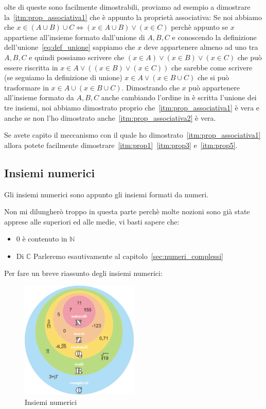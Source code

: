 \documentclass{article}
\begin{document}
olte di queste sono facilmente dimostrabili, proviamo ad esempio a dimostrare la~\ref{itm:prop_associativa1} che è appunto la proprietà associativa: \newline
Se noi abbiamo che $x \in (A \cup B) \cup C \Leftrightarrow (x \in A \cup B) \lor (x \in C)$ perchè appunto se $x$ appartiene all'insieme formato dall'unione di $A,B,C$ e conoscendo la definizione dell'unione~\ref{eq:def_unione}  sappiamo che $x$ deve appartenere almeno ad uno tra $A,B,C$ e quindi possiamo scrivere che $(x \in A) \lor (x \in B) \lor (x \in C)$ che può essere riscritta in $x \in A \lor ((x \in B) \lor (x \in C))$ che sarebbe come scrivere (se seguiamo la definizione di unione) $x \in A \lor (x \in B \cup C)$ che si può trasformare in $x \in A \cup (x \in B \cup C)$.
Dimostrando che $x$ può appartenere all'insieme formato da $A,B,C$ anche cambiando l'ordine in è scritta l'unione dei tre insiemi, noi abbiamo dimostrato proprio che~\ref{itm:prop_associativa1} è vera e anche se non l'ho dimostrato anche~\ref{itm:prop_associativa2} è vera.\par
Se avete capito il meccanismo con il quale ho dimostrato~\ref{itm:prop_associativa1} allora potete facilmente dimostrare~\ref{itm:prop1}~\ref{itm:prop3} e~\ref{itm:prop5}.


\subsection{Insiemi numerici}
Gli insiemi numerici sono appunto gli insiemi formati da numeri. \par
Non mi dilungherò troppo in questa parte perchè molte nozioni sono già state apprese alle superiori ed alle medie, vi basti sapere che:
\begin{itemize}
        \item $0$ è contenuto in $\mathbb{N}$
        \item Di $\mathbb{C}$ Parleremo esautivamente al capitolo~\ref{sec:numeri_complessi} 
\end{itemize}

Per fare un breve riassunto degli insiemi numerici:
\begin{figure}[h]
        \centering
                \includegraphics[width=0.5\textwidth]{insiemi_numerici.png}
        \caption{Insiemi numerici}\label{fig:insiemi_numerici}
\end{figure}
\end{document}
